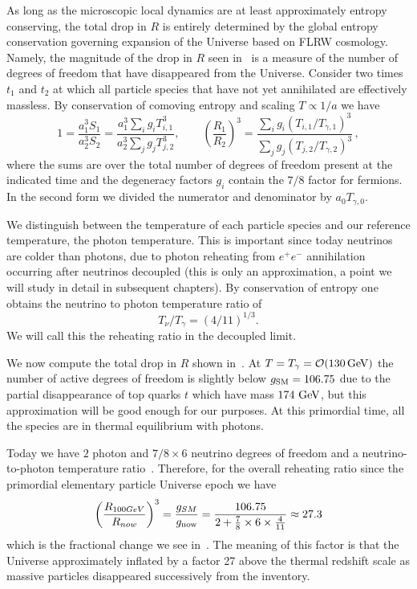 As long as the microscopic local dynamics are at least approximately entropy conserving, the total drop in $R$ is entirely determined by the global entropy conservation governing expansion of the Universe based on FLRW cosmology. Namely, the magnitude of the drop in $R$ seen in~ is a measure of the number of degrees of freedom that have disappeared from the Universe. Consider two times $t_1$ and $t_2$ at which all particle species that have not yet annihilated are effectively massless. By conservation of comoving entropy and scaling $T\propto 1/a$ we have
\begin{equation}\label{r_ratio}
1=\frac{a_1^3S_{1}}{a_2^3 S_2}=\frac{a_1^3\sum_ig_i T_{i,1}^3}{a_2^3\sum_j g_j T_{j,2}^3},\qquad \left(\frac{R_1}{R_2}\right)^3=\frac{\sum_ig_i (T_{i,1}/T_{\gamma,1})^3}{\sum_j g_j (T_{j,2}/T_{\gamma,2})^3}
\,,
\end{equation}
where the sums are over the total number of degrees of freedom present at the indicated time and the degeneracy factors $g_i$ contain the $7/8$ factor for fermions. In the second form we divided the numerator and denominator by $a_{0}T_{\gamma,0}$. 

We distinguish between the temperature of each particle species and our reference temperature, the photon temperature. This is important since today neutrinos are colder than photons, due to photon reheating from $e^+e^-$ annihilation occurring after neutrinos decoupled (this is only an approximation, a point we will study in detail in subsequent chapters). By conservation of entropy one obtains the neutrino to photon temperature ratio of
\begin{equation}\label{T_nu_T_gamma}
T_\nu/T_\gamma=({4}/{11})^{1/3}.
\end{equation}
We will call this the reheating ratio in the decoupled limit. 

We now compute the total drop in $R$ shown in~. At $T=T_\gamma=\mathcal{O}(130\text{\,GeV})$ the number of active degrees of freedom is slightly below $g_{\rm SM}=106.75$ due to the partial disappearance of top quarks $t$ which have mass $174\,\text{\,GeV}$, but this approximation will be good enough for our purposes. At this primordial time, all the species are in thermal equilibrium with photons.

Today we have $2$ photon and $7/8\times 6$ neutrino degrees of freedom and a neutrino-to-photon temperature ratio~. Therefore, for the overall reheating ratio since the primordial elementary particle Universe epoch we have
\begin{equation}
\left(\frac{R_{100GeV}}{R_{now}}\right)^3= \frac{g_{SM}}{g_{\rm now}}=\frac{106.75}{2+\frac{7}{8}\times 6\times \frac{4}{11}}\approx 27.3
\end{equation}
which is the fractional change we see in~. The meaning of this factor is that the Universe approximately inflated by a factor 27 above the thermal redshift scale as massive particles disappeared successively from the inventory. 

